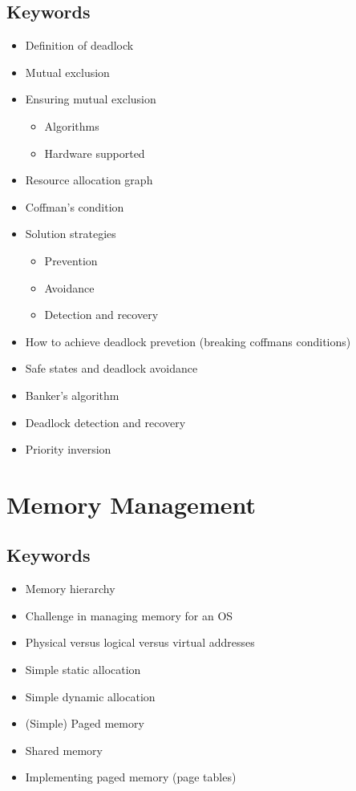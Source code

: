 \documentclass{report}
\begin{document}
\section{Keywords}
\begin{itemize}
\item Definition of deadlock
\item Mutual exclusion
\item Ensuring mutual exclusion
\begin{itemize}
\item Algorithms
\item Hardware supported
\end{itemize}
\item Resource allocation graph
\item Coffman's condition
\item Solution strategies
\begin{itemize}
\item Prevention
\item Avoidance
\item Detection and recovery
\end{itemize}
\item How to achieve deadlock prevetion (breaking coffmans conditions)
\item Safe states and deadlock avoidance
\item Banker's algorithm
\item Deadlock detection and recovery
\item Priority inversion
\end{itemize}
\newpage
\chapter{Memory Management}

\section{Keywords}
\begin{itemize}
\item Memory hierarchy
\item Challenge in managing memory for an OS
\item Physical versus logical versus virtual addresses
\item Simple static allocation
\item Simple dynamic allocation
\item (Simple) Paged memory
\item Shared memory
\item Implementing paged memory (page tables)
\end{itemize}
\newpage
\end{document}
